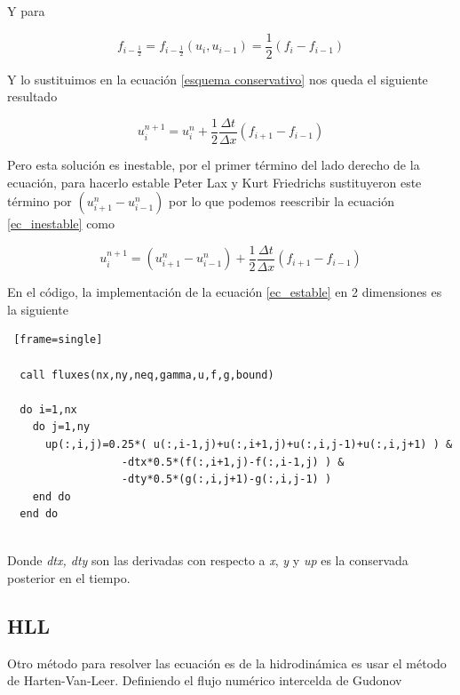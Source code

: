 \documentclass[12pt,a4paper]{book}
\begin{document}
Y para 

\begin{equation}
f_{i-\frac{1}{2}} = f_{i-\frac{1}{2}} \left(
u_{i} , u_{i-1}\right) =\frac{1}{2} \left(f_{i} - f_{i-1} \right) 
\end{equation}

Y lo sustituimos en la ecuación \ref{esquema conservativo} nos queda el siguiente resultado

\begin{equation}\label{ec_inestable}
u_i^{n+1} = u_i^{n} + \frac{1}{2}\frac{\Delta t}{\Delta x} \left(f_{i+1} - f_{i-1} \right)
\end{equation}

Pero esta solución es inestable, por el primer término del lado derecho de la ecuación, para hacerlo estable Peter Lax y Kurt Friedrichs sustituyeron este término por $(u_{i+1}^n-u_{i-1}^n)$  por lo que podemos reescribir la ecuación \ref{ec_inestable} como

\begin{equation}\label{ec_estable}
u_i^{n+1} =(u_{i+1}^n-u_{i-1}^n) + \frac{1}{2}\frac{\Delta t}{\Delta x} \left(f_{i+1} - f_{i-1} \right)
\end{equation}

En el código, la implementación de la ecuación \ref{ec_estable} en 2 dimensiones es la siguiente

\begin{lstlisting} [frame=single]

  call fluxes(nx,ny,neq,gamma,u,f,g,bound)

  do i=1,nx
    do j=1,ny
      up(:,i,j)=0.25*( u(:,i-1,j)+u(:,i+1,j)+u(:,i,j-1)+u(:,i,j+1) ) &
                  -dtx*0.5*(f(:,i+1,j)-f(:,i-1,j) ) &
                  -dty*0.5*(g(:,i,j+1)-g(:,i,j-1) )
    end do
  end do
  
\end{lstlisting}

Donde \emph{dtx, dty} son las derivadas con respecto a \emph{x}, \emph{y} y \emph{up} es la conservada posterior en el tiempo.



\subsection{HLL} \label{secc:HLL}

	Otro método para resolver las ecuación  es de la hidrodinámica es usar el método de Harten-Van-Leer. Definiendo el flujo numérico intercelda de Gudonov
\end{document}
